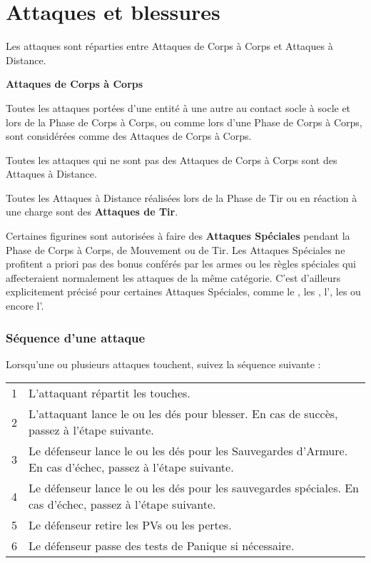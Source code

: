 
\part{Attaques et blessures}
\label{attacks_and_damage}

Les attaques sont réparties entre Attaques de Corps à Corps et Attaques à Distance.

\noindent\textbf{Attaques de Corps à Corps}

Toutes les attaques portées d'une entité à une autre au contact socle à socle et lors de la Phase de Corps à Corps, ou comme lors d'une Phase de Corps à Corps, sont considérées comme des Attaques de Corps à Corps.

\noindent\textbf{}

Toutes les attaques qui ne sont pas des Attaques de Corps à Corps sont des Attaques à Distance.

Toutes les Attaques à Distance réalisées lors de la Phase de Tir ou en réaction à une charge sont des \textbf{Attaques de Tir}.

\noindent\textbf{}

Certaines figurines sont autorisées à faire des \textbf{Attaques Spéciales} pendant la Phase de Corps à Corps, de Mouvement ou de Tir. Les Attaques Spéciales ne profitent a priori pas des bonus conférés par les armes ou les règles spéciales qui affecteraient normalement les attaques de la même catégorie. C'est d'ailleurs explicitement précisé pour certaines Attaques Spéciales, comme le \stomp{}, les \grindingattacks{}, l'\crushattack{}, les \impacthits{} ou encore l'\breathweapon{}.

\section{Séquence d'une attaque}

Lorsqu'une ou plusieurs attaques touchent, suivez la séquence suivante :

\hspace*{0.3cm}
\begin{tabular}{c|m{14cm}}
1 & L'attaquant répartit les touches. \tabularnewline
2 & L'attaquant lance le ou les dés pour blesser. En cas de succès, passez à l'étape suivante. \tabularnewline 
3 & Le défenseur lance le ou les dés pour les Sauvegardes d'Armure. En cas d'échec, passez à l'étape suivante. \tabularnewline
4 & Le défenseur lance le ou les dés pour les sauvegardes spéciales. En cas d'échec, passez à l'étape suivante. \tabularnewline
5 & Le défenseur retire les PVs ou les pertes. \tabularnewline
6 & Le défenseur passe des tests de Panique si nécessaire. \tabularnewline
\end{tabular}

